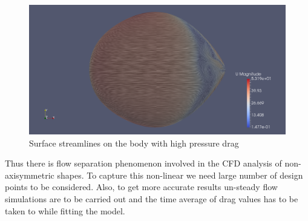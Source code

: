 \begin{figure}[H]
	\centering
	\includegraphics[width=300 pt]{rnd/streamlines_45.png}
	\caption{Surface streamlines on the body with high pressure drag}
	\label{high drag body} %
\end{figure}

Thus there is flow separation phenomenon involved in the CFD analysis of non-axisymmetric shapes. To capture this non-linear we need large number of design points to be considered. Also, to get more accurate results un-steady flow simulations are to be carried out and the time average of drag values has to be taken to while fitting the model.

